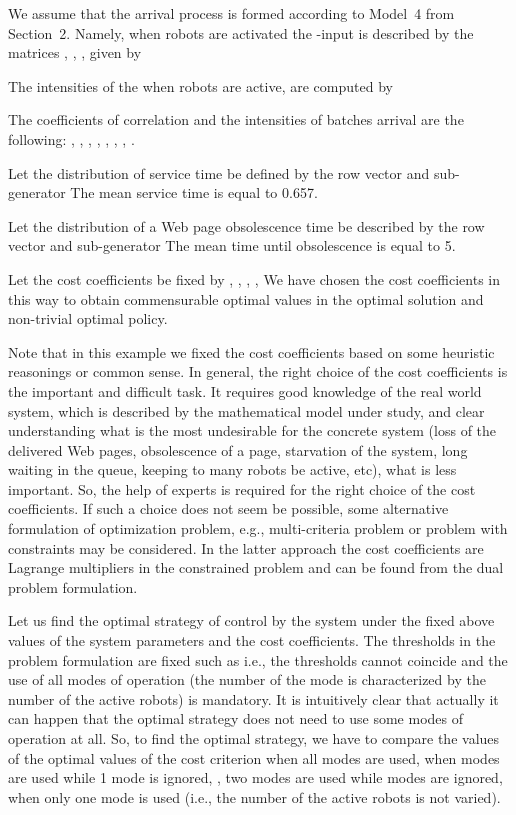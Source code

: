 \documentclass[11pt]{article}
\begin{document}
We assume that the arrival process is formed according to Model~4
from Section~2. Namely, when  robots are activated the
-input is described by the matrices ,
, , given by



The intensities  of the  when  robots are
active,  are computed by

The  coefficients of correlation  and the intensities
of  batches arrival  are the following:
, ,
, ,
, ,
, .

Let the  distribution of service time be defined by the row
vector  and sub-generator
  The mean service
time is equal to 0.657.

Let the  distribution of a Web page obsolescence time be
described by the row vector  and  sub-generator
  The mean time
until obsolescence is equal to 5.

Let the cost  coefficients be fixed by , ,
, ,  We have chosen the cost coefficients
in this way to obtain commensurable optimal values in the optimal solution
and non-trivial optimal policy.

Note that in this example we fixed the cost coefficients based on
some heuristic reasonings or common sense. In general, the right
choice of the cost coefficients is the important and difficult task.
It requires good knowledge of the real world system, which is
described by the mathematical model under study, and clear
understanding what is the most undesirable for the concrete system
(loss of the delivered Web pages, obsolescence of a page, starvation
of the system, long waiting in the queue, keeping to many robots be
active, etc), what is less important. So, the help of experts is
required for the right choice of the cost coefficients. If such a
choice does not seem be possible, some alternative formulation of
optimization problem, e.g., multi-criteria problem or problem with
constraints may be considered. In the latter approach the cost
coefficients are Lagrange multipliers in the constrained problem
and can be found from the dual problem formulation. 

Let us find the optimal strategy of control by the system under the
fixed above values of the system parameters and the cost
coefficients. The thresholds  in the problem
formulation are fixed such as 
i.e., the thresholds cannot coincide and the use of  all  modes
of operation (the number of the mode is characterized by the number
of the active robots) is mandatory. It is intuitively clear that
actually it can happen that the optimal strategy does not need to
use some modes of operation at all. So, to find the optimal
strategy, we have to compare the values of the optimal values of the
cost criterion when all  modes are used, when  modes are
used while 1 mode is ignored, , two modes are used while
 modes are ignored, when only one mode is used (i.e., the
number of the active robots is not varied).
\end{document}
